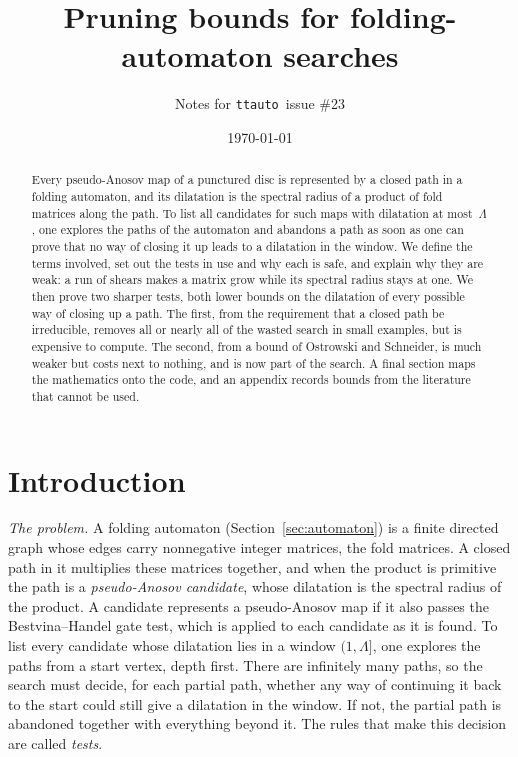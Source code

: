 \documentclass[11pt]{amsart}
\newcommand{\ttauto}{\texttt{ttauto}}
\newcommand{\Lam}{\Lambda}
\theoremstyle{plain}
\theoremstyle{definition}
\begin{document}
\title{Pruning bounds for folding-automaton searches}
\author{Notes for \ttauto\ issue \#23}
\date{\today}

\begin{abstract}
  Every pseudo-Anosov map of a punctured disc is represented by a closed
  path in a folding automaton, and its dilatation is the spectral radius of
  a product of fold matrices along the path.  To list all candidates for
  such maps with dilatation at most~$\Lam$, one explores the paths of the
  automaton and
  abandons a path as soon as one can prove that no way of closing it up
  leads to a dilatation in the window.  We define the terms involved, set
  out the tests in use and why each is safe, and explain why they are weak:
  a run of shears makes a matrix grow while its spectral radius stays at
  one.  We then prove two sharper tests, both lower bounds on the
  dilatation of every possible way of closing up a path.  The first, from
  the requirement that a closed path be irreducible, removes all or nearly
  all of the wasted search in small examples, but is expensive to compute.
  The second, from a bound of Ostrowski and Schneider, is much weaker but
  costs next to nothing, and is now part of the search.  A final section
  maps the mathematics onto the code, and an appendix records bounds from
  the literature that cannot be used.
\end{abstract}

\maketitle

\tableofcontents

\section{Introduction}
\label{sec:intro}

\emph{The problem.}  A folding automaton (Section~\ref{sec:automaton}) is
a finite directed graph whose edges carry nonnegative integer matrices,
the fold matrices.  A closed path in it multiplies these matrices
together, and when the product is primitive the path is a
\emph{pseudo-Anosov candidate}, whose dilatation is the spectral radius of
the product.  A candidate represents a pseudo-Anosov map if it also passes
the Bestvina--Handel gate test, which is applied to each candidate as it
is found.  To list every candidate whose dilatation lies in a window
$(1,\Lam]$, one explores the paths from a start vertex, depth first.  There
are infinitely many paths, so the search must decide, for each partial
path, whether any way of continuing it back to the start could still give
a dilatation in the window.  If not, the partial path is abandoned together
with everything beyond it.  The rules that make this decision are called
\emph{tests}.
\end{document}
